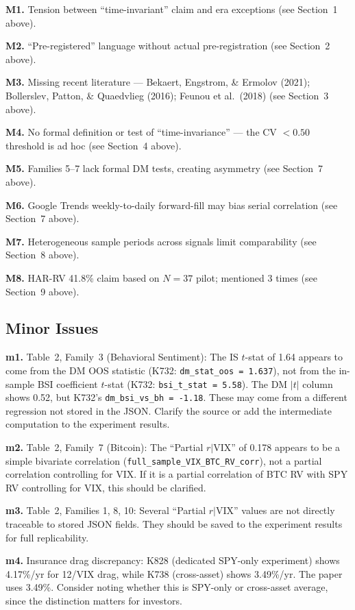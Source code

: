 \documentclass[12pt,a4paper]{article}
\begin{document}
\textbf{M1.} Tension between ``time-invariant'' claim and era exceptions (see Section~1 above).

\textbf{M2.} ``Pre-registered'' language without actual pre-registration (see Section~2 above).

\textbf{M3.} Missing recent literature --- Bekaert, Engstrom, \& Ermolov (2021); Bollerslev, Patton, \& Quaedvlieg (2016); Feunou et al.\ (2018) (see Section~3 above).

\textbf{M4.} No formal definition or test of ``time-invariance'' --- the CV $< 0.50$ threshold is ad hoc (see Section~4 above).

\textbf{M5.} Families 5--7 lack formal DM tests, creating asymmetry (see Section~7 above).

\textbf{M6.} Google Trends weekly-to-daily forward-fill may bias serial correlation (see Section~7 above).

\textbf{M7.} Heterogeneous sample periods across signals limit comparability (see Section~8 above).

\textbf{M8.} HAR-RV 41.8\% claim based on $N=37$ pilot; mentioned 3 times (see Section~9 above).


\subsection*{Minor Issues}

\textbf{m1.} Table~2, Family~3 (Behavioral Sentiment): The IS $t$-stat of 1.64 appears to come from the DM OOS statistic (K732: \texttt{dm\_stat\_oos = 1.637}), not from the in-sample BSI coefficient $t$-stat (K732: \texttt{bsi\_t\_stat = 5.58}). The DM $|t|$ column shows 0.52, but K732's \texttt{dm\_bsi\_vs\_bh = -1.18}. These may come from a different regression not stored in the JSON. Clarify the source or add the intermediate computation to the experiment results.

\textbf{m2.} Table~2, Family~7 (Bitcoin): The ``Partial $r|\text{VIX}$'' of 0.178 appears to be a simple bivariate correlation (\texttt{full\_sample\_VIX\_BTC\_RV\_corr}), not a partial correlation controlling for VIX. If it is a partial correlation of BTC RV with SPY RV controlling for VIX, this should be clarified.

\textbf{m3.} Table~2, Families 1, 8, 10: Several ``Partial $r|\text{VIX}$'' values are not directly traceable to stored JSON fields. They should be saved to the experiment results for full replicability.

\textbf{m4.} Insurance drag discrepancy: K828 (dedicated SPY-only experiment) shows 4.17\%/yr for 12/VIX drag, while K738 (cross-asset) shows 3.49\%/yr. The paper uses 3.49\%. Consider noting whether this is SPY-only or cross-asset average, since the distinction matters for investors.
\end{document}
